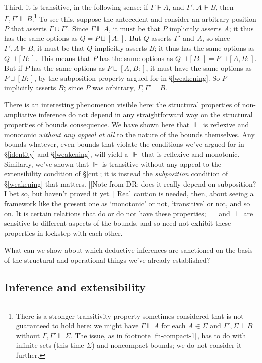 \documentclass{article}
\newcommand{\G}{\ensuremath{\Gamma}}
\newcommand{\Sig}{\ensuremath{\Sigma}}
\newcommand{\pcup}{\ensuremath{\sqcup}}
\newcommand{\pos}[2]{\ensuremath{[#1:#2]}}
\newcommand{\cns}{\vdash}
\newcommand{\ded}{\Vdash}
\begin{document}
Third, it is transitive, in the following sense: if $\G \ded A$, and $\G', A \ded B$, then $\G, \G' \ded B$.\footnote{\label{fn-compact-2}There is a stronger transitivity property sometimes considered that is not guaranteed to hold here: we might have $\G \ded A$ for each $A \in \Sig$ and $\G', \Sig \ded B$ without $\G, \G' \ded \Sig$.
The issue, as in footnote \ref{fn-compact-1}, has to do with infinite sets (this time $\Sig$) and noncompact bounds; we do not consider it further.
}
To see this, suppose the antecedent and consider an arbitrary position $P$ that asserts $\G \cup \G'$.
Since $\G \ded A$, it must be that $P$ implicitly asserts $A$; it thus has the same options as $Q = P \pcup \pos{A}{}$. 
But $Q$ asserts $\G'$ and $A$, so since $\G', A \ded B$, it must be that $Q$ implicitly asserts $B$; it thus has the same options as $Q \pcup \pos{B}{}$.
This means that $P$ has the same options as $Q \pcup \pos{B}{} = P \pcup \pos{A, B}{}$.
But if $P$ has the same options as $P \pcup \pos{A, B}{}$, it must have the same options as $P \pcup \pos{B}{}$, by the subposition property argued for in \S\ref{weakening}.
So $P$ implicitly asserts $B$; since $P$ was arbitrary, $\G, \G' \ded B$.

There is an interesting phenomenon visible here: the structural properties of non-ampliative inference do not depend in any straightforward way on the structural properties of bounds consequence.
We have shown here that $\ded$ is reflexive and monotonic {\em without any appeal at all} to the nature of the bounds themselves.
Any bounds whatever, even bounds that violate the conditions we've argued for in \S\ref{identity} and \S\ref{weakening}, will yield a $\ded$ that is reflexive and monotonic.
Similarly, we've shown that $\ded$ is transitive without any appeal to the extensibility condition of \S\ref{cut}; it is instead the {\em subposition} condition of \S\ref{weakening} that matters. [[Note from DR: does it really depend on subposition? I bet so, but haven't proved it yet.]]
Real caution is needed, then, about seeing a framework like the present one as `monotonic' or not, `transitive' or not, and so on. 
It is certain relations that do or do not have these properties; $\cns$ and $\ded$ are sensitive to different aspects of the bounds, and so need not exhibit these properties in lockstep with each other.


What can we show about which deductive inferences are sanctioned on the basis of the structural and operational things we've already established?


\subsection{Inference and extensibility}
\end{document}

